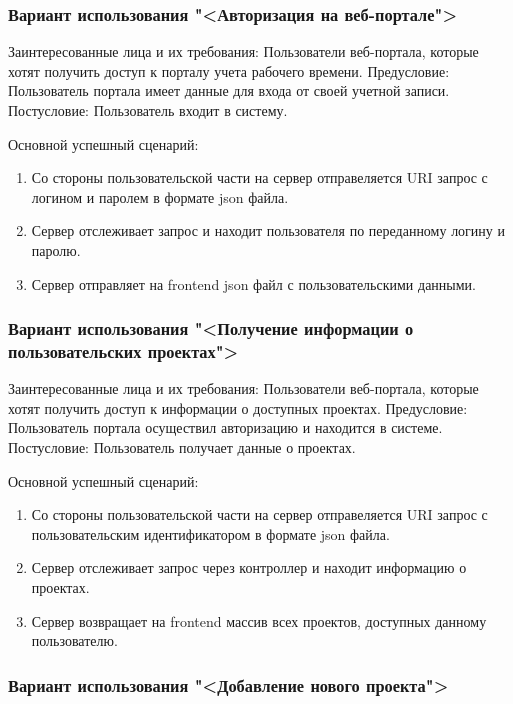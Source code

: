\subsubsection{Вариант использования "<Авторизация на веб-портале">}

Заинтересованные лица и их требования: Пользователи веб-портала, которые хотят получить доступ к порталу учета рабочего времени.
Предусловие: Пользователь портала имеет данные для входа от своей учетной записи. Постусловие: Пользователь входит в систему.

Основной успешный сценарий:
\begin{enumerate}
\item Со стороны пользовательской части на сервер отправеляется URI запрос с логином и паролем в формате json файла.
\item Сервер отслеживает запрос и находит пользователя по переданному логину и паролю.
\item Сервер отправляет на frontend json файл с пользовательскими данными.
\end{enumerate}

\subsubsection{Вариант использования "<Получение информации о пользовательских проектах">}

Заинтересованные лица и их требования: Пользователи веб-портала, которые хотят получить доступ к информации о доступных проектах.
Предусловие: Пользователь портала осуществил авторизацию и находится в системе. Постусловие: Пользователь получает данные о проектах.

Основной успешный сценарий:
\begin{enumerate}
	\item Со стороны пользовательской части на сервер отправеляется URI запрос с пользовательским идентификатором в формате json файла.
	\item Сервер отслеживает запрос через контроллер и находит информацию о проектах.
	\item Сервер возвращает на frontend массив всех проектов, доступных данному пользователю.
\end{enumerate}

\subsubsection{Вариант использования "<Добавление нового проекта">}

